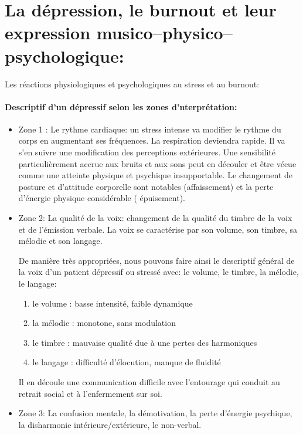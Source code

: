    \section{La dépression, le burnout et leur expression musico--physico--psychologique:}

Les réactions physiologiques et psychologiques au stress et au burnout:
 
\paragraph{Descriptif d'un dépressif selon les zones d'nterprétation:}



\begin{itemize}
  	\item Zone 1 :  Le rythme cardiaque: un stress intense va modifier le rythme
  du corps en augmentant ses fréquences. La respiration deviendra
  rapide. Il va s'en suivre une modification des perceptions
  extérieures. Une sensibilité particulièrement accrue aux bruits et
  aux sons peut en découler et être vécue comme une
  atteinte physique et psychique insupportable.
  Le changement de posture et d'attitude corporelle sont
notables (affaissement) et la perte d'énergie physique considérable ( épuisement).


 	\item Zone 2: La qualité de la voix: changement de la qualité du timbre de la
 voix et de l'émission verbale.
  La voix se caractérise par son volume, son timbre, sa mélodie et son langage. 
 	
 	De manière très appropriées, nous pouvons faire ainsi le
        descriptif général de la voix d'un patient dépressif ou
        stressé avec: le volume, le timbre, la
        mélodie, le langage: 
 	\begin{enumerate}
 		\item le volume : basse intensité, faible dynamique
 		\item la mélodie : monotone, sans modulation
 		\item le timbre : mauvaise qualité due à une pertes des harmoniques
 		\item le langage : difficulté d'élocution, manque de fluidité
 	\end{enumerate}
        Il en découle une communication difficile avec l'entourage qui  conduit au retrait social et à l'enfermement sur soi.
        
	\item Zone 3: La confusion mentale, la démotivation, la perte d'énergie
psychique, la disharmonie intérieure/extérieure, le non-verbal.
\end{itemize}

